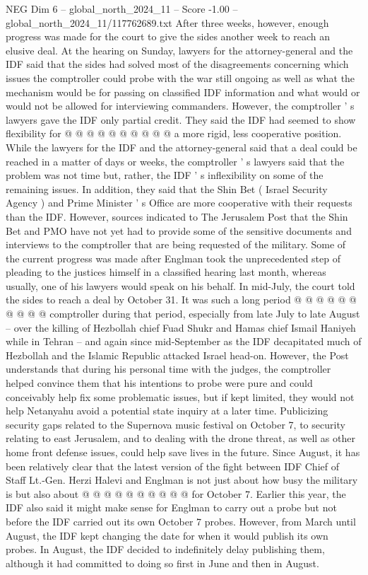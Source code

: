 \begin{textsample}{NEG Dim 6 – global\_north\_2024\_11 – Score -1.00 – global\_north\_2024\_11/117762689.txt}
After three weeks, however, enough progress was made for the court to give the sides another week to reach an elusive deal.
At the hearing on Sunday, lawyers for the attorney-general and the IDF said that the sides had solved most of the disagreements concerning which issues the comptroller could probe with the war still ongoing as well as what the mechanism would be for passing on classified IDF information and what would or would not be allowed for interviewing commanders.
However, the comptroller ' s lawyers gave the IDF only partial credit.
They said the IDF had seemed to show flexibility for @ @ @ @ @ @ @ @ @ @ a more rigid, less cooperative position.
While the lawyers for the IDF and the attorney-general said that a deal could be reached in a matter of days or weeks, the comptroller ' s lawyers said that the problem was not time but, rather, the IDF ' s inflexibility on some of the remaining issues.
In addition, they said that the Shin Bet ( Israel Security Agency ) and Prime Minister ' s Office are more cooperative with their requests than the IDF.
However, sources indicated to The Jerusalem Post that the Shin Bet and PMO have not yet had to provide some of the sensitive documents and interviews to the comptroller that are being requested of the military.
Some of the current progress was made after Englman took the unprecedented step of pleading to the justices himself in a classified hearing last month, whereas usually, one of his lawyers would speak on his behalf.
In mid-July, the court told the sides to reach a deal by October 31.
It was such a long period @ @ @ @ @ @ @ @ @ @ comptroller during that period, especially from late July to late August -- over the killing of Hezbollah chief Fuad Shukr and Hamas chief Ismail Haniyeh while in Tehran -- and again since mid-September as the IDF decapitated much of Hezbollah and the Islamic Republic attacked Israel head-on.
However, the Post understands that during his personal time with the judges, the comptroller helped convince them that his intentions to probe were pure and could conceivably help fix some problematic issues, but if kept limited, they would not help Netanyahu avoid a potential state inquiry at a later time.
Publicizing security gaps related to the Supernova music festival on October 7, to security relating to east Jerusalem, and to dealing with the drone threat, as well as other home front defense issues, could help save lives in the future.
Since August, it has been relatively clear that the latest version of the fight between IDF Chief of Staff Lt.-Gen.
Herzi Halevi and Englman is not just about how busy the military is but also about @ @ @ @ @ @ @ @ @ @ for October 7.
Earlier this year, the IDF also said it might make sense for Englman to carry out a probe but not before the IDF carried out its own October 7 probes.
However, from March until August, the IDF kept changing the date for when it would publish its own probes.
In August, the IDF decided to indefinitely delay publishing them, although it had committed to doing so first in June and then in August.

\end{textsample}
